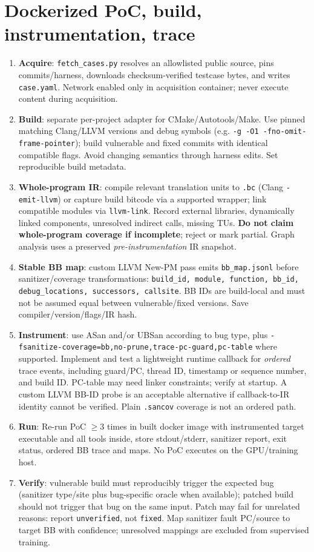 \documentclass[10pt,a4paper]{article}
\begin{document}
\section{Dockerized PoC, build, instrumentation, trace}
\begin{enumerate}
\item \textbf{Acquire}: \texttt{fetch\_cases.py} resolves an allowlisted public source, pins commits/harness, downloads checksum-verified testcase bytes, and writes \texttt{case.yaml}. Network enabled only in acquisition container; never execute content during acquisition.
\item \textbf{Build}: separate per-project adapter for CMake/Autotools/Make. Use pinned matching Clang/LLVM versions and debug symbols (e.g. \texttt{-g -O1 -fno-omit-frame-pointer}); build vulnerable and fixed commits with identical compatible flags. Avoid changing semantics through harness edits. Set reproducible build metadata.
\item \textbf{Whole-program IR}: compile relevant translation units to \texttt{.bc} (Clang \texttt{-emit-llvm}) or capture build bitcode via a supported wrapper; link compatible modules via \texttt{llvm-link}. Record external libraries, dynamically linked components, unresolved indirect calls, missing TUs. \textbf{Do not claim whole-program coverage if incomplete}; reject or mark partial. Graph analysis uses a preserved \emph{pre-instrumentation} IR snapshot.
\item \textbf{Stable BB map}: custom LLVM New-PM pass emits \texttt{bb\_map.jsonl} before sanitizer/coverage transformations: \texttt{build\_id, module, function, bb\_id, debug\_locations, successors, callsite}. BB IDs are build-local and must not be assumed equal between vulnerable/fixed versions. Save compiler/version/flags/IR hash.
\item \textbf{Instrument}: use ASan and/or UBSan according to bug type, plus \texttt{-fsanitize-coverage=bb,no-prune,trace-pc-guard,pc-table} where supported. Implement and test a lightweight runtime callback for \emph{ordered} trace events, including guard/PC, thread ID, timestamp or sequence number, and build ID. PC-table may need linker constraints; verify at startup. A custom LLVM BB-ID probe is an acceptable alternative if callback-to-IR identity cannot be verified. Plain \texttt{.sancov} coverage is not an ordered path.
\item \textbf{Run}: Re-run PoC $\ge 3$ times in built docker image with instrumented target executable and all tools inside, store stdout/stderr, sanitizer report, exit status, ordered BB trace and maps. No PoC executes on the GPU/training host.
\item \textbf{Verify}: vulnerable build must reproducibly trigger the expected bug (sanitizer type/site plus bug-specific oracle when available); patched build should not trigger that bug on the same input. Patch may fail for unrelated reasons: report \texttt{unverified}, not \texttt{fixed}. Map sanitizer fault PC/source to target BB with confidence; unresolved mappings are excluded from supervised training.
\end{enumerate}
\end{document}
